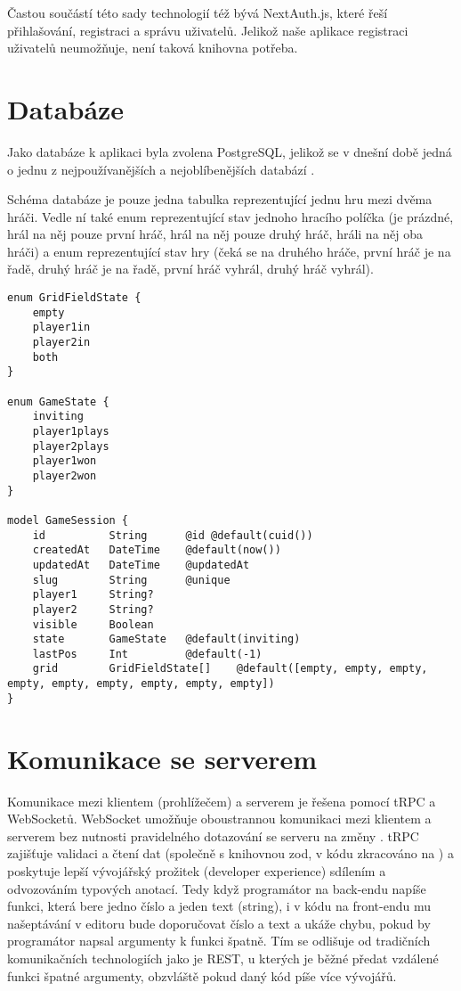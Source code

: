 Častou součástí této sady technologií též bývá NextAuth.js, které řeší přihlašování, registraci a správu uživatelů. Jelikož naše aplikace registraci uživatelů neumožňuje, není taková knihovna potřeba.

\section{Databáze}

Jako databáze k aplikaci byla zvolena PostgreSQL, jelikož se v dnešní době
jedná o jednu z nejpoužívanějších a nejoblíbenějších databází \cite{stackoverflow23}.

Schéma databáze je pouze jedna tabulka  reprezentující jednu hru
mezi dvěma hráči. Vedle ní také enum  reprezentující stav
jednoho hracího políčka (je prázdné, hrál na něj pouze první hráč, hrál na něj
pouze druhý hráč, hráli na něj oba hráči) a enum  reprezentující
stav hry (čeká se na druhého hráče, první hráč je na řadě, druhý hráč je na
řadě, první hráč vyhrál, druhý hráč vyhrál).

\begin{lstlisting}[language=Prisma,caption={Schéma databáze},label={fig:db-schema}]
enum GridFieldState {
    empty
    player1in
    player2in
    both
}

enum GameState {
    inviting
    player1plays
    player2plays
    player1won
    player2won
}

model GameSession {
    id          String      @id @default(cuid())
    createdAt   DateTime    @default(now())
    updatedAt   DateTime    @updatedAt
    slug        String      @unique
    player1     String?
    player2     String?
    visible     Boolean
    state       GameState   @default(inviting)
    lastPos     Int         @default(-1)
    grid        GridFieldState[]    @default([empty, empty, empty, empty, empty, empty, empty, empty, empty])
}
\end{lstlisting}

\section{Komunikace se serverem}

Komunikace mezi klientem (prohlížečem) a serverem je řešena pomocí tRPC a
WebSocketů. WebSocket umožňuje oboustrannou komunikaci mezi klientem a serverem
bez nutnosti pravidelného dotazování se serveru na změny \cite{mdn-ws}. tRPC
zajišťuje validaci a čtení dat (společně s knihovnou zod, v kódu zkracováno na
) a poskytuje lepší vývojářský prožitek (developer experience) sdílením a
odvozováním typových anotací. Tedy když programátor na back-endu napíše funkci,
která bere jedno číslo a jeden text (string), i v kódu na front-endu mu
našeptávání v editoru bude doporučovat číslo a text a ukáže chybu, pokud by
programátor napsal argumenty k funkci špatně. Tím se odlišuje od tradičních
komunikačních technologiích jako je REST, u kterých je běžné předat vzdálené
funkci špatné argumenty, obzvláště pokud daný kód píše více vývojářů.

